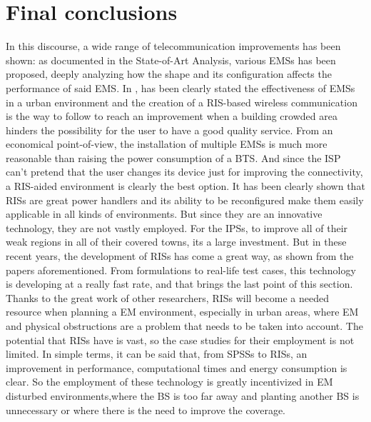 \section{Final conclusions}
In this discourse, a wide range of telecommunication improvements has been shown: as documented in the State-of-Art Analysis, various EMSs has been proposed, deeply analyzing how the shape and its configuration affects the performance of said EMS. In \cite{Oliveri:2021}, has been clearly stated the effectiveness of EMSs in a urban environment and the creation of a RIS-based wireless communication is the way to follow to reach an improvement when a building crowded area hinders the possibility for the user to have a good quality service. From an economical point-of-view, the installation of multiple EMSs is much more reasonable than raising the power consumption of a BTS. And since the ISP can't pretend that the user changes its device just for improving the connectivity, a RIS-aided environment is clearly the best option. It has been clearly shown that RISs are great power handlers and its ability to be reconfigured make them easily applicable in all kinds of environments. But since they are an innovative technology, they are not vastly employed. For the IPSs, to improve all of their weak regions in all of their covered towns, its a large investment. 
But in these recent years, the development of RISs has come a great way, as shown from the papers aforementioned. From formulations to real-life test cases, this technology is developing at a really fast rate, and
that brings the last point of this section.
Thanks to the great work of other researchers, RISs will become a needed resource when planning a EM environment,
especially in urban areas, where EM and physical obstructions are a problem that needs to be taken into account. The
potential that RISs have is vast, so the case studies for their employment is not limited.
In simple terms, it can be said that, from SPSSs to RISs, an improvement in performance, computational times and energy
consumption is clear. So the employment of these technology is greatly incentivized in EM disturbed environments,where
the BS is too far away and planting another BS is unnecessary or where there is the need to improve the coverage.